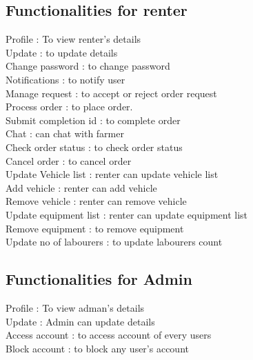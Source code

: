 \documentclass[conference]{IEEEtran}
\begin{document}
\subsection{Functionalities for renter}
Profile : To view renter's details\\
Update : to update details\\
Change password : to change password\\
Notifications : to notify user\\
Manage request : to accept or reject order request\\
Process order : to place order.\\
Submit completion id : to complete order\\
Chat : can chat with farmer\\
Check order status : to check order status\\
Cancel order : to cancel order\\
Update Vehicle list :  renter can update vehicle list\\
Add vehicle : renter can add vehicle\\
Remove vehicle : renter can remove vehicle\\
Update equipment list : renter can update equipment list\\
Remove equipment : to remove equipment\\
Update no of labourers : to update labourers count \\

\subsection{Functionalities for Admin}
Profile : To view adman's details \\
Update :  Admin can update details \\
Access account : to access account of every users\\
Block account : to block any user's account\\
\end{document}
